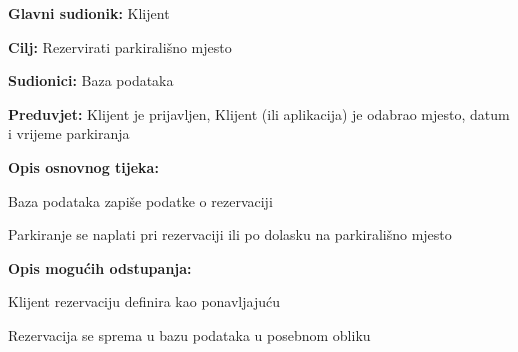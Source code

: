 \noindent {}
\begin{packed_item}
	
	\item \textbf{Glavni sudionik: }Klijent
	\item  \textbf{Cilj:} Rezervirati parkirališno mjesto
	\item  \textbf{Sudionici:} Baza podataka
	\item  \textbf{Preduvjet:} Klijent je prijavljen, Klijent (ili aplikacija) je odabrao mjesto, datum i vrijeme parkiranja
	\item  \textbf{Opis osnovnog tijeka:}
	
	\item[] \begin{packed_enum}
		
		\item Baza podataka zapiše podatke o rezervaciji
		\item Parkiranje se naplati pri rezervaciji ili po dolasku na parkirališno mjesto
		
	\end{packed_enum}
	
	\item  \textbf{Opis mogućih odstupanja:}
	
	\item[] \begin{packed_item}
		
		\item[1.a] Klijent rezervaciju definira kao ponavljajuću
		\item[] \begin{packed_enum}
			
			\item Rezervacija se sprema u bazu podataka u posebnom obliku
			
			
		\end{packed_enum}
		
		
	\end{packed_item}
	
\end{packed_item}


